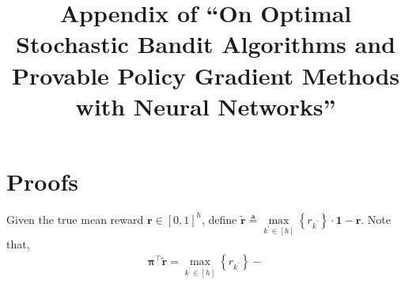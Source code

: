 \documentclass[10pt]{article}
\title{Appendix of ``On Optimal Stochastic Bandit Algorithms and Provable Policy Gradient Methods with Neural Networks''}
\author{}
\date{}
\def\rvr{{\mathbf{r}}}
\def\rvone{{\mathbf{1}}}
\def\rvtilder{{\tilde{\mathbf{r}}}}
\def\rvpi{{\boldsymbol{\pi}}}
\begin{document}
\maketitle

\section{Proofs}

Given the true mean reward $\rvr \in \left[ 0, 1 \right]^h$, define $\rvtilder \triangleq \max\limits_{k^\prime \in [h]}\left\{ r_{k^\prime } \right\} \cdot \rvone - \rvr$. Note that,
\begin{equation*}
\begin{split}
    \rvpi^\top \rvtilder = \max\limits_{k^\prime \in [h]}\left\{ r_{k^\prime }\right\} - 
\end{split}
\end{equation*}
\end{document}
